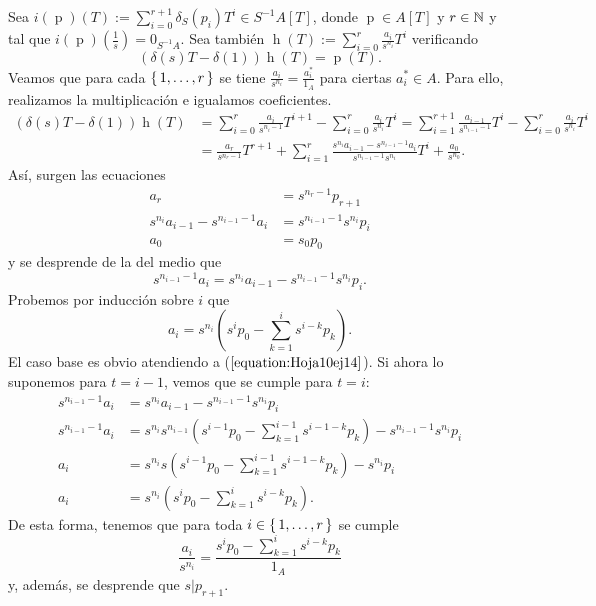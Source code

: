 \documentclass[./ejercicios.tex]{subfiles}
\begin{document}
Sea $i(\operatorname{p})(T):=\sum_{i=0}^{r+1}\delta_S(p_i)T^i\in S^{-1}A[T]$, donde $\operatorname{p}\in A[T]$ y $r\in\mathbb{N}$ y tal que $i(\operatorname{p})(\frac{1}{s})=0_{S^{-1}A}.$ Sea también $\operatorname{h}(T):=\sum_{i=0}^r\frac{a_i}{s^{n_i}}T^i$ verificando
$$(\delta(s)T-\delta(1))\operatorname{h}(T)=\operatorname{p}(T).$$
Veamos que para cada $\set{1,\dots, r}$ se tiene $\frac{a_i}{s^{n_i}}=\frac{a^*_i}{1_A}$ para ciertas $a^*_i\in A$. Para ello, realizamos la multiplicación e igualamos coeficientes.
\begin{equation}
\begin{split}
(\delta(s)T-\delta(1))\operatorname{h}(T)&=\sum_{i=0}^{r}\frac{a_i}{s^{n_i-1}}T^{i+1}-\sum_{i=0}^r\frac{a_i}{s^{n_i}}T^i=\sum_{i=1}^{r+1}\frac{a_{i-1}}{s^{n_{i-1}-1}}T^{i}-\sum_{i=0}^r\frac{a_i}{s^{n_i}}T^i\\
&=\frac{a_r}{s^{n_r-1}}T^{r+1}+\sum_{i=1}^r\frac{s^{n_i}a_{i-1}-s^{n_{i-1}-1}a_{i}}{s^{n_{i-1}-1}s^{n_i}}T^{i}+\frac{a_0}{s^{n_0}}.
\end{split}
\end{equation}
Así, surgen las ecuaciones
\begin{equation}\label{equation:Hoja10ej14}
\begin{split}
a_r&=s^{n_r-1}p_{r+1}\\
s^{n_i}a_{i-1}-s^{n_{i-1}-1}a_{i}&=s^{n_{i-1}-1}s^{n_i}p_i\\
a_0&=s_0p_0
\end{split}
\end{equation}
y se desprende de la del medio que
$$s^{n_{i-1}-1}a_i=s^{n_i}a_{i-1}-s^{n_{i-1}-1}s^{n_i}p_i.$$
Probemos por inducción sobre $i$ que
$$a_i=s^{n_i}(s^ip_0-\sum_{k=1}^is^{i-k}p_k).$$
El caso base es obvio atendiendo a ($\ref{equation:Hoja10ej14}$). Si ahora lo suponemos para $t=i-1$, vemos que se cumple para $t=i$:
\begin{equation}
\begin{split}
s^{n_{i-1}-1}a_i&=s^{n_i}a_{i-1}-s^{n_{i-1}-1}s^{n_i}p_i\\
s^{n_{i-1}-1}a_i&=s^{n_i}s^{n_{i-1}}(s^{i-1}p_0-\sum_{k=1}^{i-1}s^{i-1-k}p_k)-s^{n_{i-1}-1}s^{n_i}p_i\\
a_i&=s^{n_i}s(s^{i-1}p_0-\sum_{k=1}^{i-1}s^{i-1-k}p_k)-s^{n_i}p_i\\
a_i&=s^{n_i}(s^ip_0-\sum_{k=1}^is^{i-k}p_k).
\end{split}
\end{equation}
De esta forma, tenemos que para toda $i\in\set{1,\dots, r}$ se cumple
$$\frac{a_i}{s^{n_i}}=\frac{s^ip_0-\sum_{k=1}^is^{i-k}p_k}{1_A}$$
y, además, se desprende que $s|p_{r+1}.$
\end{document}
